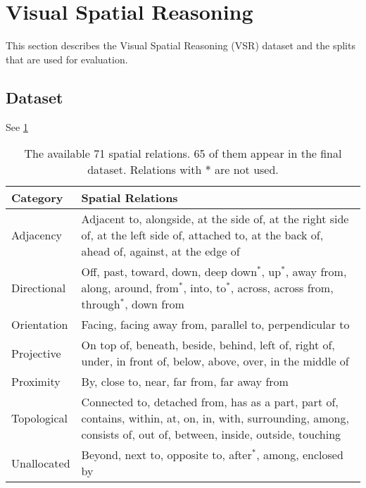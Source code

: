 \section{Visual Spatial Reasoning} \label{sec:vsr}

This section describes the Visual Spatial Reasoning (VSR) \cite{liu2022visual} dataset and the splits that are used for evaluation.

\subsection{Dataset}

See \cref{tab:spatial_relations}

\begin{table}[ht]
    \centering
    \begin{adjustbox}{max width=\textwidth}
    \begin{tabular}{l|l}
    \toprule
        \rowcolor{DarkGray}
    Category & Spatial Relations \\
    \midrule
    Adjacency   & \makecell[l]{Adjacent to, alongside, at the side of, at the right side of, at the left side of, attached to, at the back of,\\ ahead of, against, at the edge of} \\
    \rowcolor{Gray}
 Directional & \makecell[l]{Off, past, toward, down, deep down$^\ast$, up$^\ast$, away from, along, around, from$^\ast$, into, to$^\ast$, across, across from, \\through$^\ast$, down from }\\
    Orientation & Facing, facing away from, parallel to, perpendicular to\\
    \rowcolor{Gray}
    Projective & On top of, beneath, beside, behind, left of, right of, under, in front of, below, above, over, in the middle of\\
    Proximity & By, close to, near, far from, far away from \\
        \rowcolor{Gray}
    Topological & \makecell[l]{Connected to, detached from, has as a part, part of, contains, within, at, on, in, with, surrounding, among, \\ consists of, out of, between, inside, outside, touching}\\
    Unallocated & Beyond, next to, opposite to, after$^\ast$, among, enclosed by \\
\bottomrule
    \end{tabular}
    \end{adjustbox}
    \caption{The available 71 spatial relations. 65 of them appear in the final dataset. Relations with $\ast$ are not used.}
    \label{tab:spatial_relations}
\end{table}

